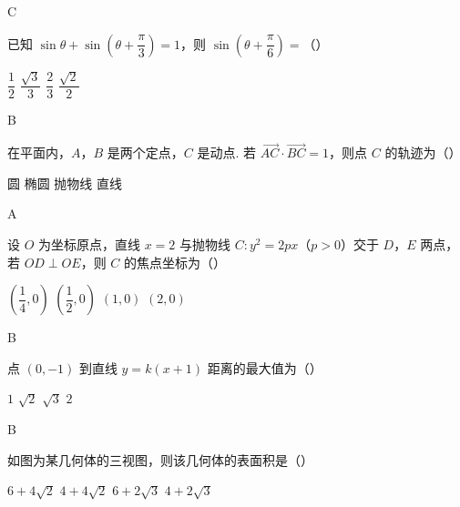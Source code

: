 \begin{answer}
C
\end{answer}



\begin{problem}
已知 \(\sin\theta+\sin\left( \theta+\dfrac{\pi}{3} \right)=1\)，则 \(\sin\left( \theta+\dfrac{\pi}{6} \right)=\)（\quad）

\choices
    {\(\dfrac{1}{2}\)}
    {\(\dfrac{\sqrt3}{3}\)}
    {\(\dfrac{2}{3}\)}
    {\(\dfrac{\sqrt2}{2}\)}
\end{problem}

\begin{answer}
B
\end{answer}



\begin{problem}
在平面内，\(A\)，\(B\) 是两个定点，\(C\) 是动点. 若 \(\overrightarrow{AC}\cdot\overrightarrow{BC}=1\)，则点 \(C\) 的轨迹为（\quad）

\choices
    {圆}
    {椭圆}
    {抛物线}
    {直线}
\end{problem}

\begin{answer}
A
\end{answer}



\begin{problem}
设 \(O\) 为坐标原点，直线 \(x=2\) 与抛物线 \(C:y^2=2px\)（\(p>0\)）交于 \(D\)，\(E\) 两点，若 \(OD\perp OE\)，则 \(C\) 的焦点坐标为（\quad）

\choices
    {\(\left( \dfrac{1}{4},0 \right)\)}
    {\(\left( \dfrac{1}{2},0 \right)\)}
    {\((1,0)\)}
    {\((2,0)\)}
\end{problem}

\begin{answer}
B
\end{answer}



\begin{problem}
点 \((0,-1)\) 到直线 \(y=k(x+1)\) 距离的最大值为（\quad）

\choices
    {\(1\)}
    {\(\sqrt2\)}
    {\(\sqrt3\)}
    {\(2\)}
\end{problem}

\begin{answer}
B
\end{answer}



\begin{problem}
如图为某几何体的三视图，则该几何体的表面积是（\quad）


\choices
    {\(6+4\sqrt2\)}
    {\(4+4\sqrt2\)}
    {\(6+2\sqrt3\)}
    {\(4+2\sqrt3\)}
\end{problem}

